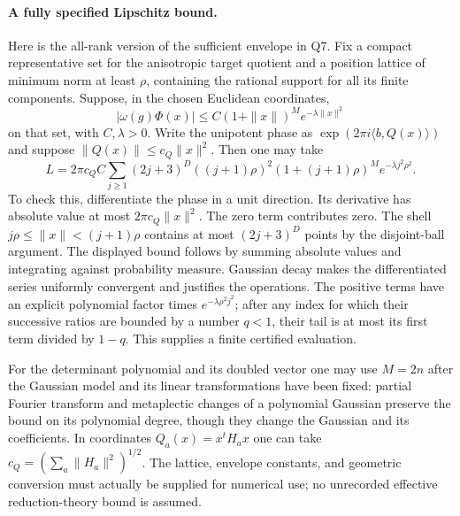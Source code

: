 \documentclass[11pt]{article}
\theoremstyle{definition}\newtheorem{definition}[theorem]{Definition}\newtheorem{remark}[theorem]{Remark}
\begin{document}
\paragraph{A fully specified Lipschitz bound.}
Here is the all-rank version of the sufficient envelope in Q7.
Fix a compact representative set for the anisotropic target
quotient and a position lattice of minimum norm at least $\rho$,
containing the rational support for all its finite components.
Suppose, in the chosen Euclidean coordinates,
\[
 |\omega(g)\Phi(x)|
      \leq C(1+\|x\|)^M e^{-\lambda\|x\|^2}
\]
on that set, with $C,\lambda>0$. Write the unipotent phase as
$\exp(2\pi i\langle b,Q(x)\rangle)$ and suppose
$\|Q(x)\|\leq c_Q\|x\|^2$. Then one may take
\begin{equation}\label{Q10-L}
 L=2\pi c_QC\sum_{j\geq1}(2j+3)^D
       ((j+1)\rho)^2(1+(j+1)\rho)^M
                   e^{-\lambda j^2\rho^2}.
\end{equation}
To check this, differentiate the phase in a unit direction.
Its derivative has absolute value at most
$2\pi c_Q\|x\|^2$. The zero term contributes zero.
The shell $j\rho\leq\|x\|<(j+1)\rho$ contains at most
$(2j+3)^D$ points by the disjoint-ball argument. The displayed
bound follows by summing absolute values and integrating against
probability measure. Gaussian decay makes the differentiated
series uniformly convergent and justifies the operations.
The positive terms have an explicit polynomial factor times
$e^{-\lambda\rho^2j^2}$; after any index for which their
successive ratios are bounded by a number $q<1$, their tail is
at most its first term divided by $1-q$. This supplies a finite
certified evaluation.

For the determinant polynomial and its doubled vector one may
use $M=2n$ after the Gaussian model and its linear transformations
have been fixed: partial Fourier transform and metaplectic
changes of a polynomial Gaussian preserve the bound on its
polynomial degree, though they change the Gaussian and its
coefficients. In coordinates $Q_a(x)=x^tH_ax$ one can take
$c_Q=(\sum_a\|H_a\|^2)^{1/2}$. The lattice, envelope constants,
and geometric conversion must actually be supplied for numerical
use; no unrecorded effective reduction-theory bound is assumed.
\end{document}
